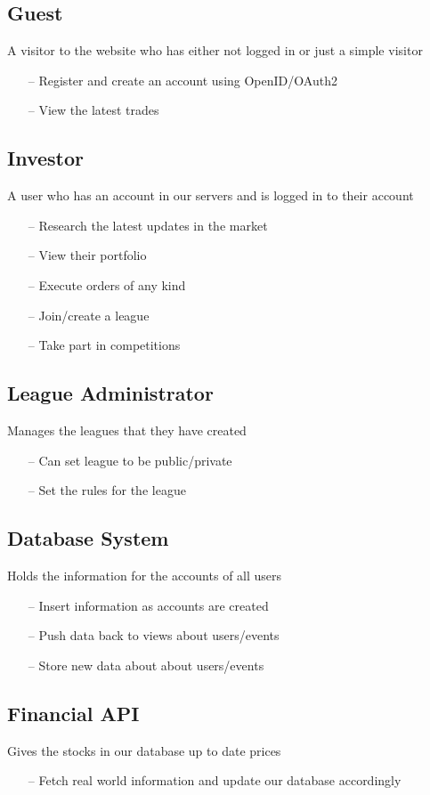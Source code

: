\subsection{Guest}
A visitor to the website who has either not logged in or just a simple visitor
\begin{itemize}
\item[--] Register and create an account using OpenID/OAuth2
\item[--] View the latest trades
\end{itemize}

\subsection{Investor}
A user who has an account in our servers and is logged in to their account
\begin{itemize}
\item[--] Research the latest updates in the market
\item[--] View their portfolio
\item[--] Execute orders of any kind
\item[--] Join/create a league
\item[--] Take part in competitions
\end{itemize}

\subsection{League Administrator}
Manages the leagues that they have created
\begin{itemize}
\item[--] Can set league to be public/private
\item[--] Set the rules for the league
\end{itemize}

\subsection{Database System}
Holds the information for the accounts of all users
\begin{itemize}
\item[--] Insert information as accounts are created
\item[--] Push data back to views about users/events
\item[--] Store new data about about users/events
\end{itemize}

\subsection{Financial API}
Gives the stocks in our database up to date prices
\begin{itemize}
\item[--] Fetch real world information and update our database accordingly
\end{itemize}

